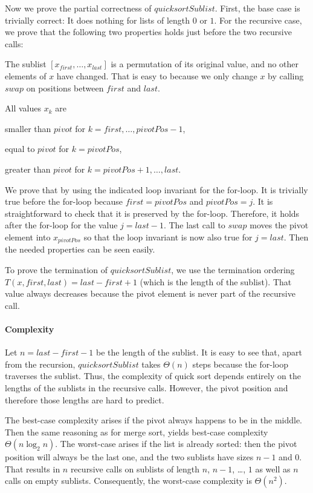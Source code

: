 Now we prove the partial correctness of $quicksortSublist$.
First, the base case is trivially correct: It does nothing for lists of length $0$ or $1$.
For the recursive case, we prove that the following two properties holds just before the two recursive calls:
\begin{compactitem}
 \item The sublist $[x_{first},\ldots,x_{last}]$ is a permutation of its original value, and no other elements of $x$ have changed.
  That is easy to because we only change $x$ by calling $swap$ on positions between $first$ and $last$.
 \item All values $x_k$ are
  \begin{compactitem}
    \item smaller than $pivot$ for $k=first,\ldots,pivotPos-1$,
    \item equal to $pivot$ for $k=pivotPos$,
    \item greater than $pivot$ for $k=pivotPos+1,\ldots,last$.
  \end{compactitem}
  We prove that by using the indicated loop invariant for the for-loop.
  It is trivially true before the for-loop because $first=pivotPos$ and $pivotPos=j$.
  It is straightforward to check that it is preserved by the for-loop.
  Therefore, it holds after the for-loop for the value $j=last-1$.
  The last call to $swap$ moves the pivot element into $x_{pivotPos}$ so that the loop invariant is now also true for $j=last$.
  Then the needed properties can be seen easily.
\end{compactitem}
\medskip

To prove the termination of $quicksortSublist$, we use the termination ordering $T(x,first,last)=last-first+1$ (which is the length of the sublist).
That value always decreases because the pivot element is never part of the recursive call.

\paragraph{Complexity}
Let $n=last-first-1$ be the length of the sublist.
It is easy to see that, apart from the recursion, $quicksortSublist$ takes $\Theta(n)$ steps because the for-loop traverses the sublist.
Thus, the complexity of quick sort depends entirely on the lengths of the sublists in the recursive calls.
However, the pivot position and therefore those lengths are hard to predict.

The best-case complexity arises if the pivot always happens to be in the middle.
Then the same reasoning as for merge sort, yields best-case complexity $\Theta(n\log_2 n)$.
The worst-case arises if the list is already sorted: then the pivot position will always be the last one, and the two sublists have sizes $n-1$ and $0$.
That results in $n$ recursive calls on sublists of length $n$, $n-1$, \ldots, $1$ as well as $n$ calls on empty sublists.
Consequently, the worst-case complexity is $\Theta(n^2)$.

